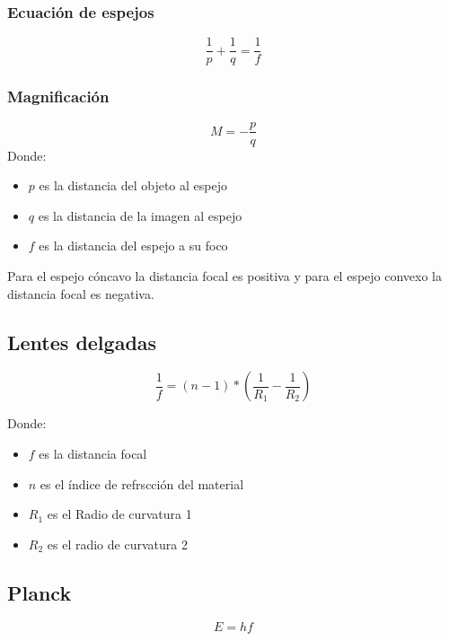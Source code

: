 \documentclass[]{article}
\begin{document}
\subsubsection{Ecuación de espejos}


\begin{equation}
\frac{1}{p}+\frac{1}{q}=\frac{1}{f}
\end{equation}

\subsubsection{Magnificación}


\begin{equation}
M=-\frac{p}{q}
\end{equation}
Donde:
\begin{itemize}
	\item $p$ es la distancia del objeto al espejo
	\item $q$ es la distancia de la imagen al espejo
	\item $f$ es la distancia del espejo a su foco
\end{itemize}

Para el espejo cóncavo la distancia focal es positiva y para el espejo convexo la distancia focal es negativa.\\

\subsection{Lentes delgadas}
\begin{equation}
\frac{1}{f}=(n-1)*(\frac{1}{R_1}-\frac{1}{R_2})
\end{equation}


Donde:\\

\begin{itemize}
	\item $f$ es la distancia focal
	\item  $n$ es el índice de refrscción del material
	\item  $R_1$ es el Radio de curvatura 1
	\item  $R_2$ es el radio de curvatura 2
\end{itemize}


\subsection{Planck}
\begin{equation}
E=hf
\end{equation}
\end{document}
